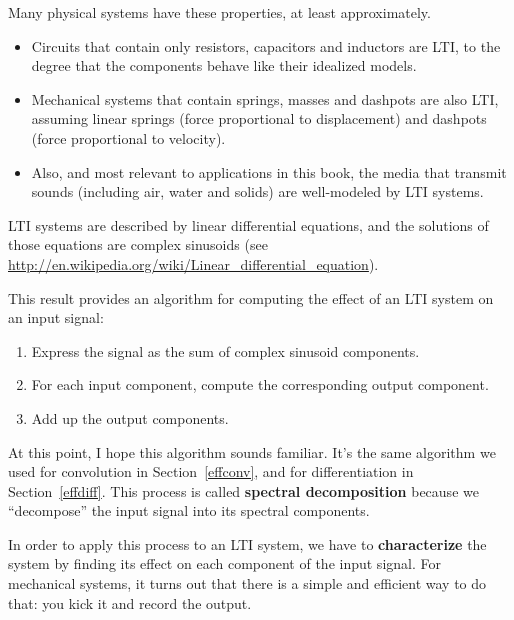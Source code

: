 \documentclass[12pt]{book}
\begin{document}
Many physical systems have these properties, at least approximately.

\begin{itemize}

\item Circuits that contain only resistors, capacitors and inductors are
LTI, to the degree that the components behave like their idealized
models.

\item Mechanical systems that contain springs, masses and
dashpots are also LTI, assuming linear springs (force proportional
to displacement) and dashpots (force proportional to velocity).

\item Also, and most relevant to applications in this book,
the media that transmit sounds (including air, water
and solids) are well-modeled by LTI systems.

\end{itemize}

LTI systems are described by linear differential equations, and
the solutions of those equations are complex sinusoids (see
\url{http://en.wikipedia.org/wiki/Linear_differential_equation}).

This result provides an algorithm for computing the effect of
an LTI system on an input signal:

\begin{enumerate}

\item Express the signal as the sum of complex sinusoid components.

\item For each input component, compute the corresponding output component.

\item Add up the output components.

\end{enumerate}

At this point, I hope this algorithm sounds familiar.  It's the
same algorithm we used for convolution in Section~\ref{effconv}, and
for differentiation in Section~\ref{effdiff}.  This process
is called {\bf spectral decomposition} because we ``decompose''
the input signal into its spectral components.

In order to apply this process to an LTI system, we have to {\bf
  characterize} the system by finding its effect on each component
of the input signal.  For mechanical systems, it turns out that there
is a simple and efficient way to do that: you kick it and record
the output.
\end{document}
